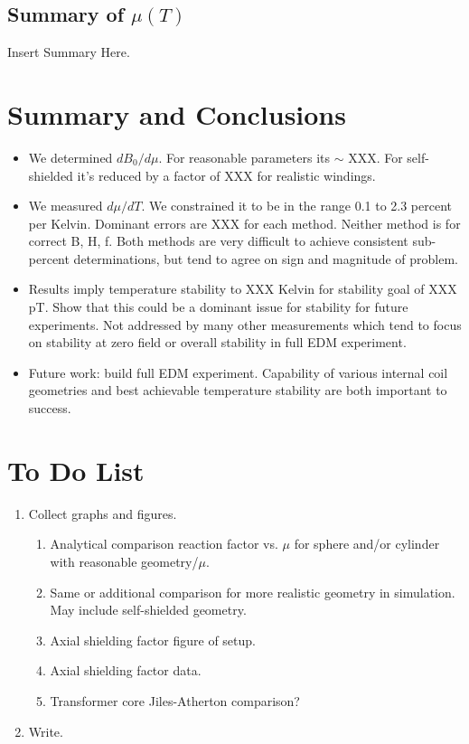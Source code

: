 \documentclass[review]{elsarticle}
\begin{document}
\subsection{Summary of $\mu(T)$}

Insert Summary Here.

\section{Summary and Conclusions}

\begin{itemize}
\item We determined $dB_0/d\mu$.  For reasonable parameters its $\sim$ XXX.  For self-shielded it's reduced by a factor of XXX for realistic windings.
\item We measured $d\mu/dT$.  We constrained it to be in the range 0.1
  to 2.3 percent per Kelvin.  Dominant errors are XXX for each method.
  Neither method is for correct B, H, f.  Both methods are very
  difficult to achieve consistent sub-percent determinations, but tend
  to agree on sign and magnitude of problem.
\item Results imply temperature stability to XXX Kelvin for stability
  goal of XXX pT.  Show that this could be a dominant issue for
  stability for future experiments.  Not addressed by many other
  measurements which tend to focus on stability at zero field or
  overall stability in full EDM experiment.
\item Future work: build full EDM experiment.  Capability of various
  internal coil geometries and best achievable temperature stability
  are both important to success.
\end{itemize}

\section{To Do List}

\begin{enumerate}
\item Collect graphs and figures.
\begin{enumerate}
\item Analytical comparison reaction factor vs. $\mu$ for
  sphere and/or cylinder with reasonable geometry/$\mu$.
\item Same or additional comparison for more realistic geometry in
  simulation.  May include self-shielded geometry.
\item Axial shielding factor figure of setup.
\item Axial shielding factor data.
\item Transformer core Jiles-Atherton comparison?
\end{enumerate}
\item Write.
\end{enumerate}
\end{document}
